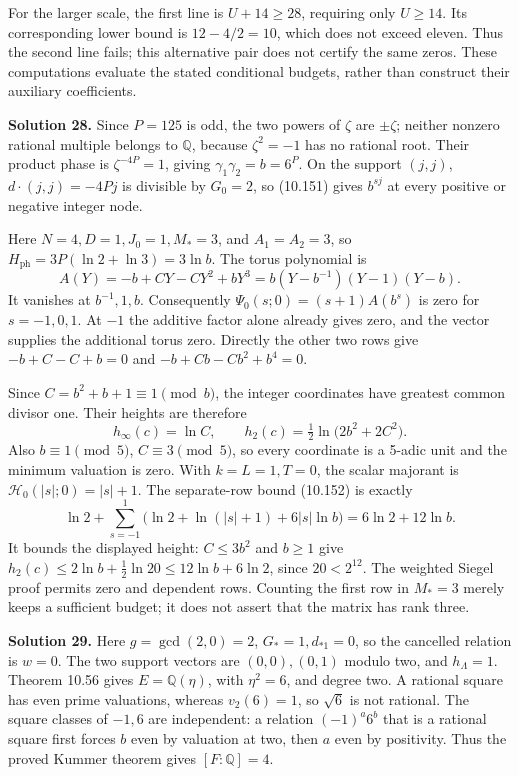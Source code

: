 \documentclass[
  11pt,
  a4paper,
]{article}
\begin{document}
For the larger scale, the first line is \(U+14\ge28\), requiring only
\(U\ge14\). Its corresponding lower bound is \(12-4/2=10\), which does
not exceed eleven. Thus the second line fails; this alternative pair
does not certify the same zeros. These computations evaluate the stated
conditional budgets, rather than construct their auxiliary coefficients.

\textbf{Solution 28.} Since \(P=125\) is odd, the two powers of
\(\zeta\) are \(\pm\zeta\); neither nonzero rational multiple belongs to
\(\mathbb Q\), because \(\zeta^2=-1\) has no rational root. Their
product phase is \(\zeta^{-4P}=1\), giving \(\gamma_1\gamma_2=b=6^P\).
On the support \((j,j)\), \(d\cdot(j,j)=-4Pj\) is divisible by
\(G_0=2\), so (10.151) gives \(b^{sj}\) at every positive or negative
integer node.

Here \(N=4,D=1,J_0=1,M_*=3\), and \(A_1=A_2=3\), so
\(H_{\mathrm{ph}}=3P(\ln2+\ln3)=3\ln b\). The torus polynomial is \[
A(Y)=-b+CY-CY^2+bY^3
=b(Y-b^{-1})(Y-1)(Y-b).
\] It vanishes at \(b^{-1},1,b\). Consequently
\(\Psi_0(s;0)=(s+1)A(b^s)\) is zero for \(s=-1,0,1\). At \(-1\) the
additive factor alone already gives zero, and the vector supplies the
additional torus zero. Directly the other two rows give \(-b+C-C+b=0\)
and \(-b+Cb-Cb^2+b^4=0\).

Since \(C=b^2+b+1\equiv1\pmod b\), the integer coordinates have greatest
common divisor one. Their heights are therefore \[
h_\infty(c)=\ln C,\qquad
h_2(c)=\tfrac12\ln\bigl(2b^2+2C^2\bigr).
\] Also \(b\equiv1\pmod5\), \(C\equiv3\pmod5\), so every coordinate is a
5-adic unit and the minimum valuation is zero. With \(k=L=1,T=0\), the
scalar majorant is \(\mathcal H_0(|s|;0)=|s|+1\). The separate-row bound
(10.152) is exactly \[
\ln2+\sum_{s=-1}^1\bigl(\ln2+\ln(|s|+1)+6|s|\ln b\bigr)
=6\ln2+12\ln b.
\] It bounds the displayed height: \(C\le3b^2\) and \(b\ge1\) give
\(h_2(c)\le2\ln b+\tfrac12\ln20\le12\ln b+6\ln2\), since \(20<2^{12}\).
The weighted Siegel proof permits zero and dependent rows. Counting the
first row in \(M_*=3\) merely keeps a sufficient budget; it does not
assert that the matrix has rank three.

\textbf{Solution 29.} Here \(g=\gcd(2,0)=2\), \(G_*=1,d_{*1}=0\), so the
cancelled relation is \(w=0\). The two support vectors are
\((0,0),(0,1)\) modulo two, and \(h_\Lambda=1\). Theorem 10.56 gives
\(E=\mathbb Q(\eta)\), with \(\eta^2=6\), and degree two. A rational
square has even prime valuations, whereas \(v_2(6)=1\), so \(\sqrt6\) is
not rational. The square classes of \(-1,6\) are independent: a relation
\((-1)^a6^b\) that is a rational square first forces \(b\) even by
valuation at two, then \(a\) even by positivity. Thus the proved Kummer
theorem gives \([F:\mathbb Q]=4\).
\end{document}
